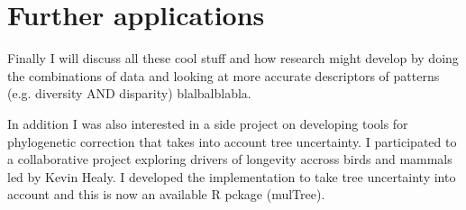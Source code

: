 \section{Further applications} %

Finally I will discuss all these cool stuff and how research might develop by doing the combinations of data and looking at more accurate descriptors of patterns (e.g. diversity AND disparity) blalbalblabla.

In addition I was also interested in a side project on developing tools for phylogenetic correction that takes into account tree uncertainty.
I participated to a collaborative project exploring drivers of longevity accross birds and mammals led by Kevin Healy.
I developed the implementation to take tree uncertainty into account and this is now an available R pckage (mulTree).
